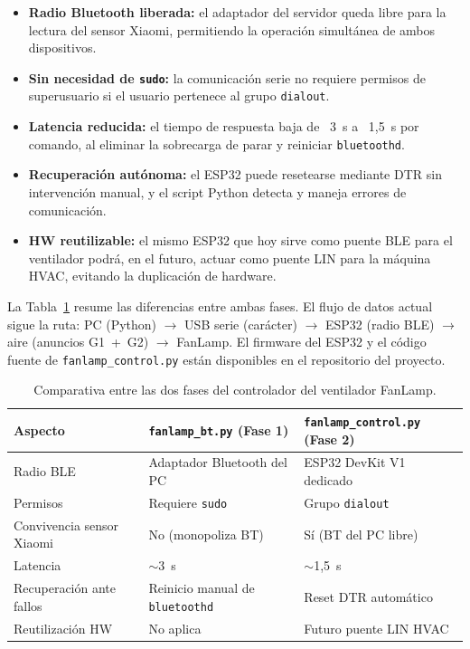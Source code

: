\begin{itemize}
    \item \textbf{Radio Bluetooth liberada:} el adaptador del servidor queda libre para la lectura del sensor Xiaomi, permitiendo la operación simultánea de ambos dispositivos.
    \item \textbf{Sin necesidad de \texttt{sudo}:} la comunicación serie no requiere permisos de superusuario si el usuario pertenece al grupo \texttt{dialout}.
    \item \textbf{Latencia reducida:} el tiempo de respuesta baja de ~3~s a ~1,5~s por comando, al eliminar la sobrecarga de parar y reiniciar \texttt{bluetoothd}.
    \item \textbf{Recuperación autónoma:} el ESP32 puede resetearse mediante DTR sin intervención manual, y el script Python detecta y maneja errores de comunicación.
    \item \textbf{HW reutilizable:} el mismo ESP32 que hoy sirve como puente BLE para el ventilador podrá, en el futuro, actuar como puente LIN para la máquina HVAC, evitando la duplicación de hardware.
\end{itemize}

La Tabla~\ref{tab:fanlamp_fases} resume las diferencias entre ambas fases. El flujo de datos actual sigue la ruta: PC (Python) $\rightarrow$ USB serie (carácter) $\rightarrow$ ESP32 (radio BLE) $\rightarrow$ aire (anuncios G1~+~G2) $\rightarrow$ FanLamp. El firmware del ESP32 y el código fuente de \texttt{fanlamp\_control.py} están disponibles en el repositorio del proyecto.

\begin{table}[ht]
\centering
\footnotesize
\begin{tabular}{|p{3cm}|p{3.2cm}|p{3.2cm}|}
\hline
\textbf{Aspecto} & \textbf{\texttt{fanlamp\_bt.py} (Fase 1)} & \textbf{\texttt{fanlamp\_control.py} (Fase 2)} \\
\hline
Radio BLE & Adaptador Bluetooth del PC & ESP32 DevKit V1 dedicado \\
Permisos & Requiere \texttt{sudo} & Grupo \texttt{dialout} \\
Convivencia sensor Xiaomi & No (monopoliza BT) & Sí (BT del PC libre) \\
Latencia & $\sim$3~s & $\sim$1,5~s \\
Recuperación ante fallos & Reinicio manual de \texttt{bluetoothd} & Reset DTR automático \\
Reutilización HW & No aplica & Futuro puente LIN HVAC \\
\hline
\end{tabular}
\caption{Comparativa entre las dos fases del controlador del ventilador FanLamp.}
\label{tab:fanlamp_fases}
\end{table}

